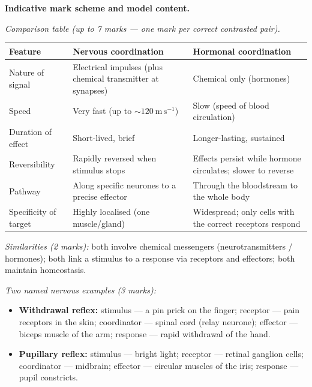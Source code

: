 \documentclass[11pt]{article}
\begin{document}
\begin{corrige}
\textbf{Indicative mark scheme and model content.}

\emph{Comparison table (up to 7 marks — one mark per correct contrasted pair).}

\begin{center}
\begin{tabularx}{\linewidth}{|l|X|X|}\hline
\rowcolor{popblueL}\textbf{Feature} & \textbf{Nervous coordination} & \textbf{Hormonal coordination} \\ \hline
Nature of signal & Electrical impulses (plus chemical transmitter at synapses) & Chemical only (hormones) \\ \hline
Speed & Very fast (up to $\sim 120\ \mathrm{m\,s^{-1}}$) & Slow (speed of blood circulation) \\ \hline
Duration of effect & Short-lived, brief & Longer-lasting, sustained \\ \hline
Reversibility & Rapidly reversed when stimulus stops & Effects persist while hormone circulates; slower to reverse \\ \hline
Pathway & Along specific neurones to a precise effector & Through the bloodstream to the whole body \\ \hline
Specificity of target & Highly localised (one muscle/gland) & Widespread; only cells with the correct receptors respond \\ \hline
\end{tabularx}
\end{center}

\emph{Similarities (2 marks):} both involve chemical messengers (neurotransmitters / hormones); both link a stimulus to a response via receptors and effectors; both maintain homeostasis.

\emph{Two named nervous examples (3 marks):}
\begin{itemize}
\item \textbf{Withdrawal reflex:} stimulus — a pin prick on the finger; receptor — pain receptors in the skin; coordinator — spinal cord (relay neurone); effector — biceps muscle of the arm; response — rapid withdrawal of the hand.
\item \textbf{Pupillary reflex:} stimulus — bright light; receptor — retinal ganglion cells; coordinator — midbrain; effector — circular muscles of the iris; response — pupil constricts.
\end{itemize}


\end{corrige}
\end{document}
